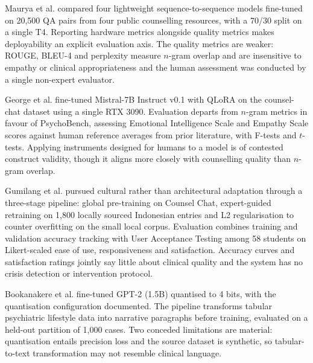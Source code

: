 \documentclass[11pt]{article}
\begin{document}
	Maurya et al.\cite{Maurya2025} compared four lightweight sequence-to-sequence models fine-tuned on 20,500 QA pairs from four public counselling resources, with a 70/30 split on a single T4. Reporting hardware metrics alongside quality metrics makes deployability an explicit evaluation axis. The quality metrics are weaker: ROUGE, BLEU-4 and perplexity measure $n$-gram overlap and are insensitive to empathy or clinical appropriateness and the human assessment was conducted by a single non-expert evaluator.
	
	George et al.\cite{10774623} fine-tuned Mistral-7B Instruct v0.1 with QLoRA on the counsel-chat dataset using a single RTX 3090. Evaluation departs from $n$-gram metrics in favour of PsychoBench, assessing Emotional Intelligence Scale and Empathy Scale scores against human reference averages from prior literature, with F-tests and $t$-tests. Applying instruments designed for humans to a model is of contested construct validity, though it aligns more closely with counselling quality than $n$-gram overlap.
	
	Gumilang et al.\cite{Gumilang2024DevelopmentOA} pursued cultural rather than architectural adaptation through a three-stage pipeline: global pre-training on Counsel Chat, expert-guided retraining on 1,800 locally sourced Indonesian entries and L2 regularisation to counter overfitting on the small local corpus. Evaluation combines training and validation accuracy tracking with User Acceptance Testing among 58 students on Likert-scaled ease of use, responsiveness and satisfaction. Accuracy curves and satisfaction ratings jointly say little about clinical quality and the system has no crisis detection or intervention protocol.
	
	Bookanakere et al.\cite{10743711} fine-tuned GPT-2 (1.5B) quantised to 4 bits, with the quantisation configuration documented. The pipeline transforms tabular psychiatric lifestyle data into narrative paragraphs before training, evaluated on a held-out partition of 1,000 cases. Two conceded limitations are material: quantisation entails precision loss and the source dataset is synthetic, so tabular-to-text transformation may not resemble clinical language.
	
\end{document}
